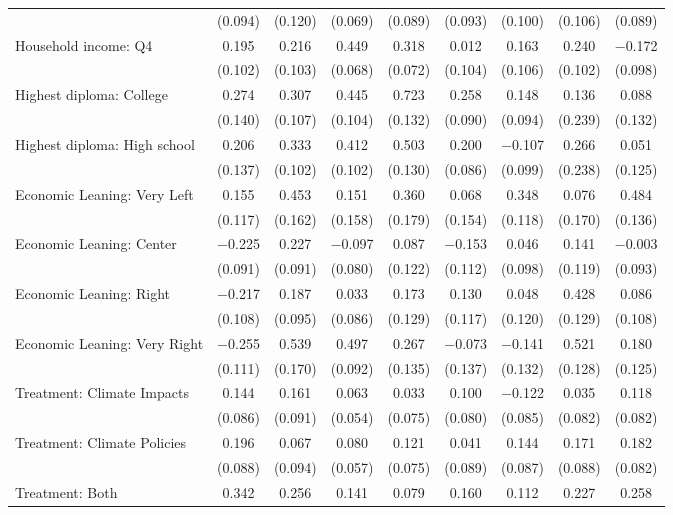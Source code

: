 \begin{tabular}{@{\extracolsep{5pt}}lcccccccc}
  & (0.094) & (0.120) & (0.069) & (0.089) & (0.093) & (0.100) & (0.106) & (0.089) \\ 
  Household income: Q4 & 0.195 & 0.216 & 0.449 & 0.318 & 0.012 & 0.163 & 0.240 & $-$0.172 \\ 
  & (0.102) & (0.103) & (0.068) & (0.072) & (0.104) & (0.106) & (0.102) & (0.098) \\ 
  Highest diploma: College & 0.274 & 0.307 & 0.445 & 0.723 & 0.258 & 0.148 & 0.136 & 0.088 \\ 
  & (0.140) & (0.107) & (0.104) & (0.132) & (0.090) & (0.094) & (0.239) & (0.132) \\ 
  Highest diploma: High school & 0.206 & 0.333 & 0.412 & 0.503 & 0.200 & $-$0.107 & 0.266 & 0.051 \\ 
  & (0.137) & (0.102) & (0.102) & (0.130) & (0.086) & (0.099) & (0.238) & (0.125) \\ 
  Economic Leaning: Very Left & 0.155 & 0.453 & 0.151 & 0.360 & 0.068 & 0.348 & 0.076 & 0.484 \\ 
  & (0.117) & (0.162) & (0.158) & (0.179) & (0.154) & (0.118) & (0.170) & (0.136) \\ 
  Economic Leaning: Center & $-$0.225 & 0.227 & $-$0.097 & 0.087 & $-$0.153 & 0.046 & 0.141 & $-$0.003 \\ 
  & (0.091) & (0.091) & (0.080) & (0.122) & (0.112) & (0.098) & (0.119) & (0.093) \\ 
  Economic Leaning: Right & $-$0.217 & 0.187 & 0.033 & 0.173 & 0.130 & 0.048 & 0.428 & 0.086 \\ 
  & (0.108) & (0.095) & (0.086) & (0.129) & (0.117) & (0.120) & (0.129) & (0.108) \\ 
  Economic Leaning: Very Right & $-$0.255 & 0.539 & 0.497 & 0.267 & $-$0.073 & $-$0.141 & 0.521 & 0.180 \\ 
  & (0.111) & (0.170) & (0.092) & (0.135) & (0.137) & (0.132) & (0.128) & (0.125) \\ 
  Treatment: Climate Impacts & 0.144 & 0.161 & 0.063 & 0.033 & 0.100 & $-$0.122 & 0.035 & 0.118 \\ 
  & (0.086) & (0.091) & (0.054) & (0.075) & (0.080) & (0.085) & (0.082) & (0.082) \\ 
  Treatment: Climate Policies & 0.196 & 0.067 & 0.080 & 0.121 & 0.041 & 0.144 & 0.171 & 0.182 \\ 
  & (0.088) & (0.094) & (0.057) & (0.075) & (0.089) & (0.087) & (0.088) & (0.082) \\ 
  Treatment: Both & 0.342 & 0.256 & 0.141 & 0.079 & 0.160 & 0.112 & 0.227 & 0.258 \\ 

\end{tabular}
